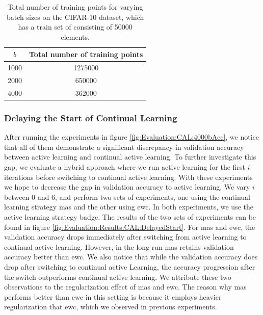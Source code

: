 \begin{table}[h]
    \centering
    \begin{tabular}{| c | c |} 
        \hline
        $b$ & Total number of training points \\
        \hline 
        1000 & 1275000 \\
        2000 & 650000 \\
        4000 & 362000 \\
        \hline
    \end{tabular}
    \caption{Total number of training points for varying batch sizes on the CIFAR-10 dataset,
    which has a train set of consisting of 50000 elements.}
    \label{fig:NumberOfTrainingPoints}
\end{table}


\subsubsection{Delaying the Start of Continual Learning}
\label{sec:Evaluation:Results:CAL:Hybrid}
After running the experiments in figure \ref{fig:Evaluation:CAL:4000bAcc}, we notice that all of them demonstrate a significant discrepancy in validation accuracy
between active learning and continual active learning. To further investigate this gap, we evaluate a hybrid approach where we run active learning for the first $i$
iterations before switching to continual active learning. With these experiments we hope to decrease the gap in validation accuracy to active learning. We vary $i$
between 0 and 6, and perform two sets of experiments, one using the continual learning strategy \gls{mas} and the other using \gls{ewc}. In both experiments, we use
the active learning strategy \gls{badge}. The results of the two sets of experiments can be found in figure  \ref{fig:Evaluation:Results:CAL:DelayedStart}. For \gls{mas}
and \gls{ewc}, the validation accuracy drops immediately after switching from active learning to continual active learning. However, in the long run \gls{mas}
retains validation accuracy better than \gls{ewc}. We also notice that while the validation accuracy does drop after switching to continual active Learning, the accuracy
progression after the switch outperforms continual active learning. We attribute these two observations to the regularization effect of \gls{mas} and \gls{ewc}. 
The reason why \gls{mas} performs better than \gls{ewc} in this setting is because it employs heavier regularization that \gls{ewc}, which we observed in previous
experiments. \par

